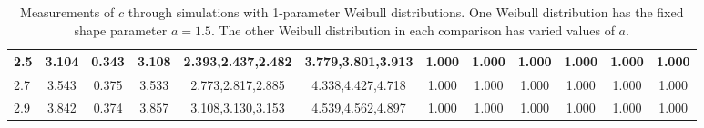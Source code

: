 \begin{table*}[h!]
\begin{center}
\begin{tabular}{| l | c | c | c | c | c | c | c | c | c | c | c |}
2.5 & 3.104 & 0.343 & 3.108 & 2.393,2.437,2.482 & 3.779,3.801,3.913  & 1.000  & 1.000  & 1.000  & 1.000  & 1.000  & 1.000 \\\hline
2.7 & 3.543 & 0.375 & 3.533 & 2.773,2.817,2.885 & 4.338,4.427,4.718  & 1.000  & 1.000  & 1.000  & 1.000  & 1.000  & 1.000 \\\hline
2.9 & 3.842 & 0.374 & 3.857 & 3.108,3.130,3.153 & 4.539,4.562,4.897  & 1.000  & 1.000  & 1.000  & 1.000  & 1.000  & 1.000 \\\hline
\end{tabular}
\caption{Measurements of $c$ through simulations
with 1-parameter Weibull distributions.
One Weibull distribution has the fixed shape parameter $a=1.5$.
The other Weibull distribution in each comparison
has varied values of $a$.}
\end{center}
\end{table*}